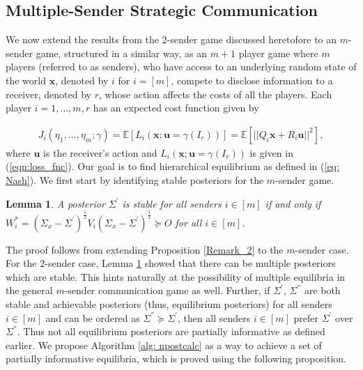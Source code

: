 \documentclass[12pt,journal,onecolumn]{IEEEtran}
\newtheorem{lemma}{Lemma}
\begin{document}
\subsection{Multiple-Sender Strategic Communication}\label{Subsect:Multiple_senders}
We now extend the results from the 2-sender game discussed heretofore to an $m$-sender game, structured in a similar way, as an $m+1$ player game where $m$ players (referred to as senders), who have access to an underlying random state of the world $\boldsymbol{x}$, denoted by $i$ for $i=[m]$, compete to disclose information to a receiver, denoted by $r$, whose action affects the costs of all the players. Each player $i=1,\hdots, m,r$ has an expected cost function given by

\begin{align*}
J_i(\eta_1,\hdots,\eta_m;\gamma)=\mathbb{E}[L_i(\boldsymbol{x};\boldsymbol{u}=\gamma(I_r))]=\mathbb{E}[||Q_i\boldsymbol{x}+R_i\boldsymbol{u}||^2],
\end{align*}
where $\boldsymbol{u}$ is the receiver's action and $L_i(\boldsymbol{x};\boldsymbol{u}=\gamma(I_r))$ is given in  (\ref{eqn:loss_fnc}). Our goal is to find hierarchical equilibrium as defined in (\ref{eq: Nash}). We first start by identifying stable posteriors for the $m$-sender game.
\begin{lemma}\label{lem: nsenstable}
A posterior $\Sigma^{'}$ is stable for all senders $i\in[m]$ if and only if $W_i^*=(\Sigma_x-\Sigma^{'})^{\frac{1}{2}}V_i(\Sigma_x-\Sigma^{'})^{\frac{1}{2}}\succeq O$ for all $i\in[m]$.
\end{lemma}
The proof follows from extending Proposition \ref{Remark_2} to the $m$-sender case. For the 2-sender case, Lemma \ref{lem: nsenstable} showed that there can be multiple posteriors which are stable. This hints naturally at the possibility of multiple equilibria in the general $m$-sender communication game as well. Further, if $\Sigma^{'}$, $\Sigma^{''}$ are both stable and achievable posteriors (thus, equilibrium posteriors) for all senders $i\in[m]$ and can be ordered as $\Sigma^{''}\succeq\Sigma^{'}$, then all senders $i\in[m]$ prefer $\Sigma^{'}$ over $\Sigma^{''}$. Thus not all equilibrium posteriors are partially informative as defined earlier. We propose Algorithm \ref{alg: npostcalc} as a way to achieve a set of partially informative equilibria, which is proved using the following proposition.
\end{document}
